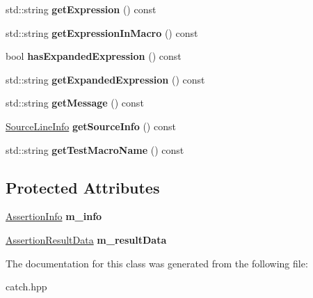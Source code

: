 \begin{DoxyCompactItemize}
std\+::string {\bfseries get\+Expression} () const
\item 
\mbox{\label{class_catch_1_1_assertion_result_aac35a0ca42d33bff6467c76573730f5e}} 
std\+::string {\bfseries get\+Expression\+In\+Macro} () const
\item 
\mbox{\label{class_catch_1_1_assertion_result_a78c43506c2b3d8cc1fb141a97d09ec94}} 
bool {\bfseries has\+Expanded\+Expression} () const
\item 
\mbox{\label{class_catch_1_1_assertion_result_aaa46070791a6c07caaed86229b8d9d75}} 
std\+::string {\bfseries get\+Expanded\+Expression} () const
\item 
\mbox{\label{class_catch_1_1_assertion_result_ae730943beed46921b09383c673e35786}} 
std\+::string {\bfseries get\+Message} () const
\item 
\mbox{\label{class_catch_1_1_assertion_result_aa4d3fdbfe276a69a035762dbb790800f}} 
\hyperlink{struct_catch_1_1_source_line_info}{Source\+Line\+Info} {\bfseries get\+Source\+Info} () const
\item 
\mbox{\label{class_catch_1_1_assertion_result_aaefd9a0384282fd08a4a72aa19bd0628}} 
std\+::string {\bfseries get\+Test\+Macro\+Name} () const
\end{DoxyCompactItemize}
\subsection*{Protected Attributes}
\begin{DoxyCompactItemize}
\item 
\mbox{\label{class_catch_1_1_assertion_result_a3e7236f73a51d6fc8bb9dfdefcee7772}} 
\hyperlink{struct_catch_1_1_assertion_info}{Assertion\+Info} {\bfseries m\+\_\+info}
\item 
\mbox{\label{class_catch_1_1_assertion_result_add3455b8bbedb0d643e18da67c66b4f7}} 
\hyperlink{struct_catch_1_1_assertion_result_data}{Assertion\+Result\+Data} {\bfseries m\+\_\+result\+Data}
\end{DoxyCompactItemize}


The documentation for this class was generated from the following file\+:\begin{DoxyCompactItemize}
\item 
catch.\+hpp\end{DoxyCompactItemize}
